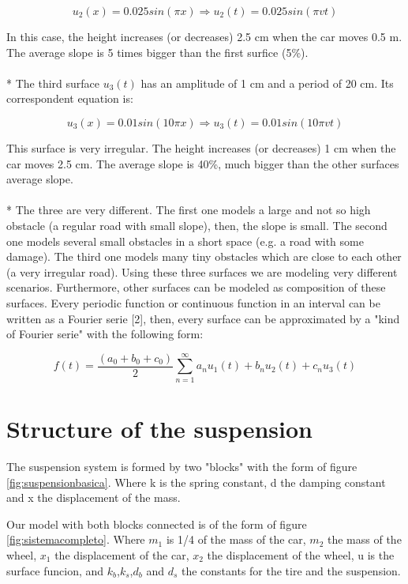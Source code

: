 \documentclass[a4paper]{article}
\begin{document}
\begin{equation}
u_2(x)=0.025sin(\pi x) \Rightarrow u_2(t)=0.025sin(\pi v t)
\end{equation}

In this case, the height increases (or decreases) 2.5 cm when the car moves 0.5 m.
The average slope is 5 times bigger than the first surfice (5\%).
\\
\\*
The third surface $u_3(t)$ has an amplitude of 1 cm and a period of 20 cm.
Its correspondent equation is:

\begin{equation}
u_3(x)=0.01sin(10\pi x) \Rightarrow u_3(t)=0.01sin(10\pi v t)
\end{equation}

This surface is very irregular.
The height increases (or decreases) 1 cm when the car moves 2.5 cm.
The average slope is 40\%,
much bigger than the other surfaces average slope.
\\
\\*
The three are very different.
The first one models a large and not so high obstacle
(a regular road with small slope), then, the slope is small.
The second one models several small obstacles in a short space (e.g. a road with some damage).
The third one models many tiny obstacles which are close to each other (a very irregular road).
Using these three surfaces we are modeling very different scenarios.
Furthermore, other surfaces can be modeled as composition of these surfaces.
Every periodic function or continuous function in an interval can be written as
a Fourier serie [2],
then, every surface can be approximated by a "kind of Fourier serie" with the following form:

\begin{equation}
f(t)=\frac{(a_0+b_0+c_0)}{2}\sum_{n=1}^{\infty} a_n u_1(t)+b_n u_2(t)+c_n u_3(t)
\end{equation}


\newpage


\section{Structure of the suspension}
The suspension system is formed by two "blocks" with the form of figure \ref{fig:suspensionbasica}.
Where k is the spring constant,
d the damping constant and x the displacement of the mass.

Our model with both blocks connected is of the form of figure \ref{fig:sistemacompleto}.
Where $m_1$ is 1/4 of the mass of the car, $m_2$ the mass of the wheel,
$x_1$ the displacement of the car, $x_2$ the displacement of the wheel,
u is the surface funcion,
and $k_b$,$k_s$,$d_b$ and $d_s$ the constants for the tire and the suspension.\\
\end{document}
